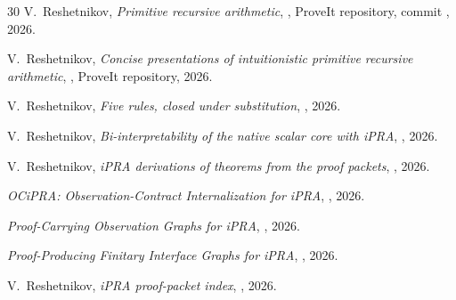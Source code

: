 \documentclass[11pt,oneside]{article}
\theoremstyle{definition}
\begin{document}
\begingroup
\small
\setlength{\parskip}{0pt}
\begin{thebibliography}{30}
\setlength{\itemsep}{0.25em}
V.~Reshetnikov, \emph{Primitive recursive arithmetic},
, ProveIt repository,
commit , 2026.

V.~Reshetnikov, \emph{Concise presentations of intuitionistic primitive recursive arithmetic},
, ProveIt repository, 2026.

V.~Reshetnikov, \emph{Five rules, closed under substitution},
, 2026.

V.~Reshetnikov, \emph{Bi-interpretability of the native scalar core with iPRA},
, 2026.

V.~Reshetnikov, \emph{iPRA derivations of theorems from the proof packets},
, 2026.

\emph{OCiPRA: Observation-Contract Internalization for iPRA},
, 2026.

\emph{Proof-Carrying Observation Graphs for iPRA},
, 2026.

\emph{Proof-Producing Finitary Interface Graphs for iPRA},
, 2026.

V.~Reshetnikov, \emph{iPRA proof-packet index},
, 2026.
\end{thebibliography}
\endgroup
\end{document}
